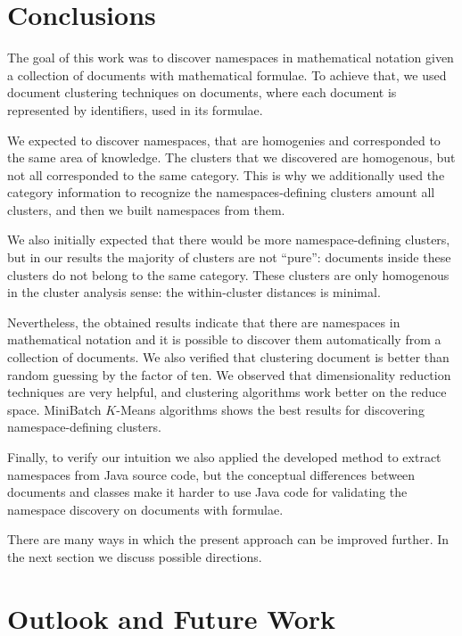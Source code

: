 \section{Conclusions} \label{sec:conclusions}

The goal of this work was to discover namespaces in mathematical notation
given a collection of documents with mathematical formulae. To achieve that,
we used document clustering techniques on documents, where each document is 
represented by identifiers, used in its formulae. 

We expected to discover namespaces, that are homogenies and corresponded
to the same area of knowledge. The clusters that we discovered are homogenous, 
but not all corresponded to the same category. This is why we 
additionally used the category information to recognize the namespaces-defining
clusters amount all clusters, and then we built namespaces from them.

We also initially expected that there would be more namespace-defining clusters, 
but in our results the majority of clusters are not ``pure'': documents inside these 
clusters do not belong to the same category. These clusters are only homogenous in 
the cluster analysis sense: the within-cluster distances is minimal. 


Nevertheless, the obtained results indicate that there are namespaces in mathematical 
notation and it is possible to discover them automatically from a collection of 
documents. We also verified that clustering document is better than random guessing 
by the factor of ten. We observed that dimensionality reduction techniques 
are very helpful, and clustering algorithms work better on the reduce space. 
MiniBatch $K$-Means algorithms shows the best results for discovering 
namespace-defining clusters.

Finally, to verify our intuition we also applied the developed method to extract 
namespaces from Java source code, but the conceptual differences between documents 
and classes make it harder to use Java code for validating the namespace discovery 
on documents with formulae. 

There are many ways in which the present approach can be improved further.
In the next section we discuss possible directions.


\section{Outlook and Future Work} \label{sec:future-work}

